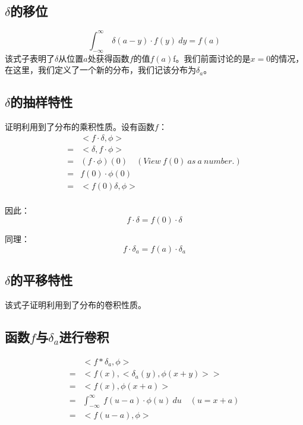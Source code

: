 \subsection{$\delta$的移位}
$$
	\int_{-\infty}^{\infty}\ \delta(a-y)\cdot f(y)\ dy=f(a)
$$
该式子表明了$\delta$从位置$a$处获得函数$f$的值$f(a)$f。我们前面讨论的是$x=0$的情况，在这里，我们定义了一个新的分布，我们记该分布为$\delta_a$。
\subsection{$\delta$的抽样特性}
证明利用到了分布的乘积性质。设有函数$f$：
\begin{align*}
	  & <f\cdot \delta,\phi>                                  \\
	= & <\delta,f\cdot \phi>                                  \\
	= & (f\cdot \phi)(0)   \quad (View\ f(0)\ as\ a\ number.) \\
	= & f(0)\cdot \phi(0)                                     \\
	= & <f(0)\delta,\phi>                                     \\
\end{align*}

因此：
\begin{equation}
	f\cdot \delta=f(0)\cdot \delta
\end{equation}

同理：
\begin{equation}
	f\cdot \delta_a=f(a)\cdot \delta_a
\end{equation}
\subsection{$\delta$的平移特性}
该式子证明利用到了分布的卷积性质。

\subsection{函数$f$与$\delta_a$进行卷积}
\begin{align*}
	  & <f*\delta_a,\phi>                                              \\
	= & <f(x),<\delta_a(y),\phi(x+y)>>                                 \\
	= & <f(x),\phi(x+a)>                                               \\
	= & \int_{-\infty}^{\infty}\ f(u-a)\cdot \phi(u)\ du \quad (u=x+a) \\
	= & <f(u-a),\phi>
\end{align*}

